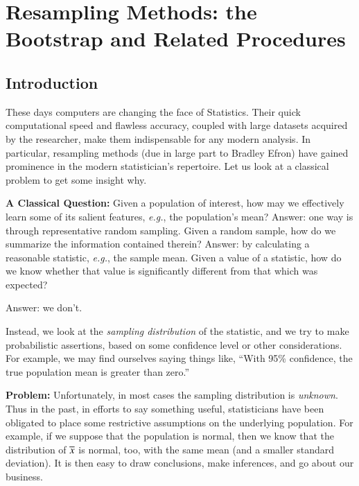 \documentclass[captions=tableheading]{scrbook}
\begin{document}
\chapter{Resampling Methods: the Bootstrap and Related Procedures}
\label{sec-4}
\section{Introduction}
\label{sec-4_1}


These days computers are changing the face of Statistics. Their quick computational speed and flawless accuracy, coupled with large datasets acquired by the researcher, make them indispensable for any modern analysis. In particular, resampling methods (due in large part to Bradley Efron) have gained prominence in the modern statistician's repertoire. Let us look at a classical problem to get some insight
why.

\textbf{A Classical Question:} Given a population of interest, how may we effectively learn some of its salient features, \emph{e.g.}, the population's mean? Answer: one way is through representative random sampling. Given a random sample, how do we summarize the information contained therein? Answer: by calculating a reasonable statistic, \emph{e.g.}, the sample mean. Given a value of a statistic, how do we know whether that value is significantly different from that which was expected?

\begin{center}
Answer: we don't. 
\end{center}

Instead, we look at the \emph{sampling distribution} of the statistic, and we try to make probabilistic assertions, based on some confidence level or other considerations. For example, we may find ourselves saying things like, ``With 95\% confidence, the true population mean is greater than zero.''

\textbf{Problem:} Unfortunately, in most cases the sampling distribution is \emph{unknown}. Thus in the past, in efforts to say something useful, statisticians have been obligated to place some restrictive assumptions on the underlying population. For example, if we suppose that the population is normal, then we know that the distribution of $\overline{x}$ is normal, too, with the same mean (and a smaller standard deviation). It is then easy to draw conclusions, make inferences, and go about our business.
\end{document}
